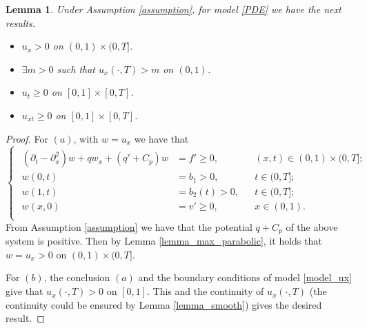 \documentclass[11pt]{article}
\newtheorem{lemma}{Lemma}[section]
\numberwithin{equation}{section}
\begin{document}
\begin{lemma}\label{lemma_positivity}
 Under Assumption \ref{assumption}, for model \eqref{PDE} we have the next results. 
\begin{itemize}
 \item [(a)] $u_x> 0$ on $(0,1)\times(0,T]$.
 \item [(b)] $\exists m>0$ such that $u_x(\cdot,T)>m$ on $(0,1)$. 
 \item [(c)] $u_t\ge 0$ on $[0,1]\times[0,T]$.
 \item [(d)] $u_{xt}\ge 0$ on $[0,1]\times[0,T]$.
\end{itemize}
\end{lemma}
\begin{proof}
 For $(a)$, with $w=u_x$ we have that  
 \begin{equation}\label{model_ux}
 \begin{cases}
  \begin{aligned}
   (\partial_t-\partial_x^2)w+qw_x+(q'+C_p)w&=f'\ge 0, &&(x,t)\in(0,1)\times(0,T];\\
   w(0,t)&=b_1>0,&&t\in(0,T];\\
   w(1,t)&=b_2(t)>0,&&t\in(0,T];\\
   w(x,0)&=v'\ge0,&&x\in(0,1).\\
  \end{aligned}
 \end{cases}
\end{equation}
From Assumption \ref{assumption} we have that the potential $q+C_p$ of the above system is positive. Then by Lemma \ref{lemma_max_parabolic}, it holds that $w=u_x> 0$ on $(0,1)\times(0,T]$. 


For $(b)$, the conclusion $(a)$ and the boundary conditions of model \eqref{model_ux} give that $u_x(\cdot,T)>0$ on $[0,1]$. This and the continuity of $u_x(\cdot,T)$ (the continuity could be ensured by Lemma \ref{lemma_smooth}) gives the desired result. 



\end{proof}
\end{document}
